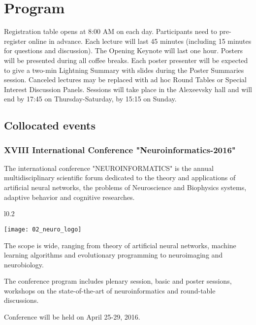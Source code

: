\documentclass[10pt,fleqn,openany]{book} %
\begin{document}

\chapter{Program}

Registration table opens at 8:00 AM on each day. Participants need to pre-register online in advance. Each lecture will last 45 minutes (including 15 minutes for questions and discussion). The Opening Keynote will last one hour. Posters will be presented during all coffee breaks. Each poster presenter will be expected to give a two-min Lightning Summary with slides during the Poster Summaries session. Canceled lectures may be replaced with ad hoc Round Tables or Special Interest Discussion Panels. Sessions will take place in the Alexeevsky hall and will end by 17:45 on Thursday-Saturday, by 15:15 on Sunday.

\section{Collocated events}

\subsection{XVIII International Conference "Neuroinformatics-2016"}

The international conference "NEUROINFORMATICS" is the annual multidisciplinary scientific forum dedicated to the theory and applications of artificial neural networks, the problems of Neuroscience and Biophysics systems, adaptive behavior and cognitive researches.

\begin{wrapfigure}{l}{0.2\textwidth}
	\begin{center}
		\texttt{[image: 02\_neuro\_logo]}
	\end{center}
\end{wrapfigure}

The scope is wide, ranging from theory of artificial neural networks, machine learning algorithms and evolutionary programming to neuroimaging and neurobiology.

The conference program includes plenary session, basic and poster sessions, workshops on the state-of-the-art of neuroinformatics and round-table discussions.

Conference will be held on April 25-29, 2016.
\end{document}
